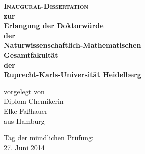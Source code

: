 \documentclass{scrartcl}
\begin{document}
\begin{center}
 \huge
 \textbf{\textsc{Inaugural-Dissertation}\\[5ex]
 \LARGE \textsf{zur\\ Erlangung der Doktorwürde\\
        der\\ Naturwissenschaftlich-Mathematischen\\
        Gesamtfakultät\\
        der\\
        Ruprecht-Karls-Universität
        Heidelberg}}


\vfill
\Large
vorgelegt von\\[2ex]
Diplom-Chemikerin\\
Elke Faßhauer\\[2ex]
aus Hamburg

\vspace{5ex}
Tag der mündlichen Prüfung:\\
27. Juni 2014

\end{center}
\end{document}
